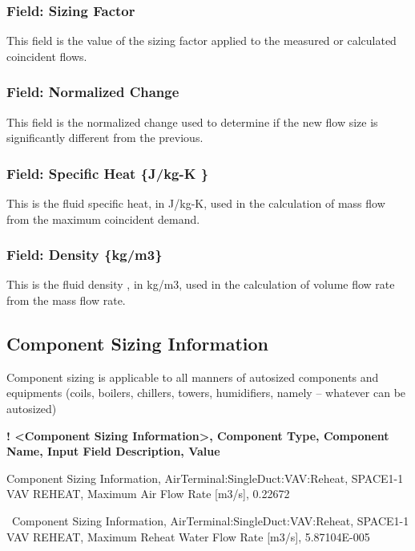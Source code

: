 \subsubsection{Field: Sizing Factor}\label{field-sizing-factor}

This field is the value of the sizing factor applied to the measured or calculated coincident flows.

\subsubsection{Field: Normalized Change}\label{field-normalized-change}

This field is the normalized change used to determine if the new flow size is significantly different from the previous.

\subsubsection{Field: Specific Heat \{J/kg-K \}}\label{field-specific-heat-jkg-k}

This is the fluid specific heat, in J/kg-K, used in the calculation of mass flow from the maximum coincident demand.

\subsubsection{Field: Density \{kg/m3\}}\label{field-density-kgm3}

This is the fluid density , in kg/m3, used in the calculation of volume flow rate from the mass flow rate.

\subsection{Component Sizing Information}\label{component-sizing-information}

Component sizing is applicable to all manners of autosized components and equipments (coils, boilers, chillers, towers, humidifiers, namely -- whatever can be autosized)

\textbf{! \textless{}Component Sizing Information\textgreater{}, Component Type, Component Name, Input Field Description, Value}

Component Sizing Information, AirTerminal:SingleDuct:VAV:Reheat, SPACE1-1 VAV REHEAT, Maximum Air Flow Rate {[}m3/s{]}, 0.22672

~Component Sizing Information, AirTerminal:SingleDuct:VAV:Reheat, SPACE1-1 VAV REHEAT, Maximum Reheat Water Flow Rate {[}m3/s{]}, 5.87104E-005

